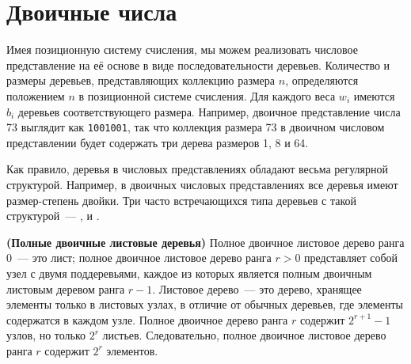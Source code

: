 \begin{frame}[fragile]{}
\inputminted[firstline=3]{haskell}{code/DenseNumbers.hs}
\end{frame}

\begin{frame}[fragile]{}
\inputminted[firstline=3]{haskell}{code/SparseByWeight.hs}
\end{frame}


\section{Двоичные числа}
\label{sc:9.2}

\begin{frame}[fragile]{}


Имея позиционную систему счисления, мы можем реализовать числовое
представление на её основе в виде последовательности
деревьев. Количество и размеры деревьев, представляющих коллекцию
размера $n$, определяются положением $n$ в позиционной системе
счисления. Для каждого веса $w_i$ имеются $b_i$ деревьев
соответствующего размера. Например, двоичное представление числа 73
выглядит как \texttt{1001001}, так что коллекция размера 73 в двоичном
числовом представлении будет содержать три дерева размеров 1, 8 и 64.

Как правило, деревья в числовых представлениях обладают весьма
регулярной структурой. Например, в двоичных числовых представлениях
все деревья имеют размер-степень двойки. Три часто встречающихся типа
деревьев с такой структурой~---  \cite{KaldewaijDielissen1996},  \cite{Vuillemin1978} и
 \cite{SackStrothotte1990}.

\end{frame}

\begin{frame}[fragile]{}

\begin{definition}
  \textbf{(Полные двоичные листовые деревья)} Полное двоичное листовое
  дерево ранга 0~--- это лист; полное двоичное листовое дерево ранга
  $r > 0$ представляет собой узел с двумя поддеревьями, каждое из
  которых является полным двоичным листовым деревом ранга $r -
  1$. Листовое дерево~--- это дерево, хранящее элементы только в
  листовых узлах, в отличие от обычных деревьев, где элементы
  содержатся в каждом узле. Полное двоичное дерево ранга $r$ содержит
  $2^{r+1} - 1$ узлов, но только $2^r$ листьев. Следовательно, полное
  двоичное листовое дерево ранга $r$ содержит $2^r$ элементов.
\end{definition}
\end{frame}

